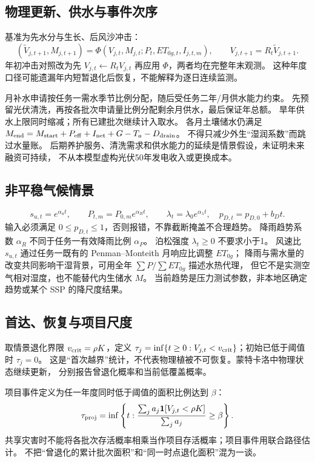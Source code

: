 \subsection{物理更新、供水与事件次序}\label{sec:shock}
基准为先水分与生长、后风沙冲击：
\[
(\widetilde V_{j,t+1},M_{j,t+1})=\Phi(V_{j,t},M_{j,t};P_t,ET_{0g,t},I_{j,t,m}),
\qquad V_{j,t+1}=R_t\widetilde V_{j,t+1}.
\]
年初冲击对照改为先 $V_{j,t}\gets R_tV_{j,t}$ 再应用 $\Phi$，两者均在完整年末观测。
这种年度口径可能遗漏年内短暂退化后恢复，不能解释为逐日连续监测。

月补水申请按任务一需水季节比例分配，随后受任务二年/月供水能力约束。
先预留光伏清洗，再按各批次申请量比例分配剩余月供水，最后保证年总额。
旱年供水上限同时缩减；所有已建批次继续计入取水。
各月土壤储水仍满足 $M_{\rm end}=M_{\rm start}+P_{\rm eff}+I_{\rm net}+G-T_a-D_{\rm drain}$。
不得只减少外生“湿润系数”而跳过水量账。
后期养护服务、清洗需求和供水能力的延续是情景假设，未证明未来融资可持续，
不从本模型虚构光伏50年发电收入或更换成本。

\subsection{非平稳气候情景}
\begin{equation}\label{eq:trend}
s_{u,t}=e^{\alpha_u t},\qquad P_{t,m}=P_{0,m}e^{\alpha_Rt},\qquad
\lambda_t=\lambda_0e^{\alpha_\lambda t},\quad p_{D,t}=p_{D,0}+b_Dt.
\end{equation}
输入必须满足 $0\le p_{D,t}\le1$，否则报错，不靠截断掩盖不合理趋势。
降雨趋势系数 $\alpha_R$ 不同于任务一有效降雨比例 $\alpha_P$。
泊松强度 $\lambda_t\ge0$ 不要求小于1。
风速比 $s_{u,t}$ 通过任务一既有的 Penman--Monteith 月响应比调整 $ET_{0g}$；
降雨与需水量的改变共同影响干湿背景，可用全年 $\sum P/\sum ET_{0g}$ 描述水热代理，
但它不是实测空气相对湿度，也不能替代内生储水 $M$。
当前趋势是压力测试参数，非本地区确定趋势或某个 SSP 的降尺度结果。

\subsection{首达、恢复与项目尺度}
取情景退化界限 $v_{\rm crit}=\rho K$，定义
$\tau_j=\inf\{t\ge0:V_{j,t}<v_{\rm crit}\}$；初始已低于阈值时 $\tau_j=0$。
这是“首次越界”统计，不代表物理植被不可恢复。蒙特卡洛中物理状态继续更新，
分别报告曾退化概率和当前低覆盖概率。

项目事件定义为任一年度同时低于阈值的面积比例达到 $\beta$：
\[
\tau_{\rm proj}=\inf\left\{t:\frac{\sum_ja_j\mathbf{1}\!\left[V_{j,t}<\rho K\right]}{\sum_ja_j}\ge\beta\right\}.
\]
共享灾害时不能将各批次存活概率相乘当作项目存活概率；项目事件用联合路径估计。
不把“曾退化的累计批次面积”和“同一时点退化面积”混为一谈。

